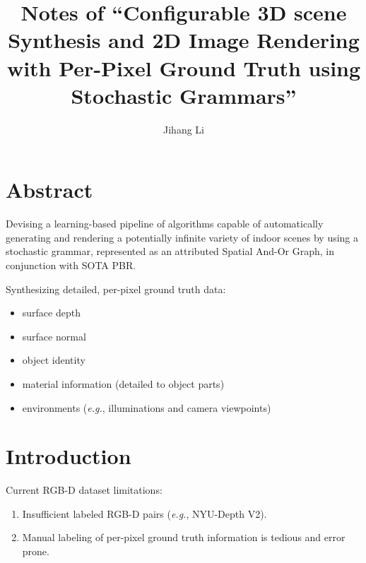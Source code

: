 \documentclass[10pt]{article}
\title{Notes of ``Configurable 3D scene Synthesis and 2D Image Rendering with
Per-Pixel Ground Truth using Stochastic Grammars''}
\author{Jihang Li}
\newcommand{\Eg}{\textit{e.g.}}
\begin{document}
\maketitle
\tableofcontents

\section*{Abstract}%
\label{sec:abstract}
Devising a learning-based pipeline of algorithms capable of automatically
generating and rendering a potentially infinite variety of indoor scenes by
using a stochastic grammar, represented as an attributed Spatial And-Or
Graph, in conjunction with SOTA PBR\@.

Synthesizing detailed, per-pixel ground truth data:
%
\begin{itemize}
  \item surface depth
  \item surface normal
  \item object identity
  \item material information (detailed to object parts)
  \item environments (\Eg, illuminations and camera viewpoints)
\end{itemize}


\section{Introduction}%
\label{sec:introduction}
Current RGB-D dataset limitations:
%
\begin{enumerate}
  \item Insufficient labeled RGB-D pairs (\Eg, NYU-Depth V2).
  \item Manual labeling of per-pixel ground truth information is tedious and
    error prone.
\end{enumerate}
\end{document}
